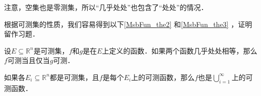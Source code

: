 注意，空集也是零测集，所以“几乎处处”也包含了“处处”的情况．

根据可测集的性质，我们容易得到以下\autoref{MsbFun_the2} 和\autoref{MsbFun_the3} ，证明留作习题．

\begin{theorem}{}\label{MsbFun_the2}
设$E\subseteq\mathbb{R}^n$是可测集，$f$和$g$是在$E$上定义的函数．如果两个函数几乎处处相等，那么$f$可测当且仅当$g$可测．
\end{theorem}



\begin{theorem}{}\label{MsbFun_the3}
如果各$E_i\subseteq\mathbb{R}^n$都是可测集，且$f$是每个$E_i$上的可测函数，那么$f$也是$\bigcup_{i=1}^\infty$上的可测函数．
\end{theorem}


